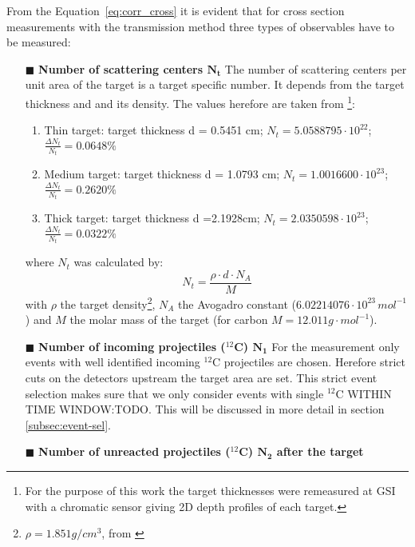 From the Equation~\ref{eq:corr_cross} it is evident that for cross section measurements with the transmission method three types of observables have to be measured:\newline
\begin{enumerate}
\item[$\blacksquare$] \textbf{Number of scattering centers $\mathbf{N_t}$}\newline
The number of scattering centers per unit area of the target is a target specific number. It depends from the target thickness and and its density. The values herefore are taken from \cite{ponnath2023precise}\footnote{For the purpose of this work the target thicknesses were remeasured at GSI with a chromatic sensor giving 2D depth profiles of each target.}:
\begin{enumerate}
\item Thin target:\newline 
target thickness d = 0.5451 cm; $N_t = 5.0588795\cdot 10^{22}$; $\frac{\Delta N_t}{N_t} = 0.0648\%$
\item Medium target:\newline
target thickness d = 1.0793 cm; $N_t = 1.0016600\cdot 10^{23}$; $\frac{\Delta N_t}{N_t} = 0.2620\%$
\item Thick target:\newline
target thickness d =2.1928cm; $N_t = 2.0350598\cdot 10^{23}$; $\frac{\Delta N_t}{N_t} = 0.0322\%$
\end{enumerate} 
where $N_t$ was calculated by:
\begin{equation}
N_t = \frac{\rho \cdot d \cdot N_A}{M}
\end{equation}
with $\rho$ the target density\footnote{$\rho = 1.851 g/cm^{3}$, from \cite{ponnath2023precise}}, $N_A$ the Avogadro constant ($6.02214076\cdot10^{23}\,mol^{-1}$) and $M$ the molar mass of the target (for carbon $M = 12.011g \cdot mol^{-1}$).
\item[$\blacksquare$] \textbf{Number of incoming projectiles ($^{12}$C) $\mathbf{N_1}$}\newline
For the measurement only events with well identified incoming $^{12}$C projectiles are chosen. Herefore strict cuts on the detectors upstream the target area are set. This strict event selection makes sure that we only consider events with single $^{12}$C WITHIN TIME WINDOW:TODO. This will be discussed in more detail in section \ref{subsec:event-sel}.  %
\item[$\blacksquare$] \textbf{Number of unreacted projectiles ($^{12}$C) $\mathbf{N_2}$ after the target}\newline

\end{enumerate}
